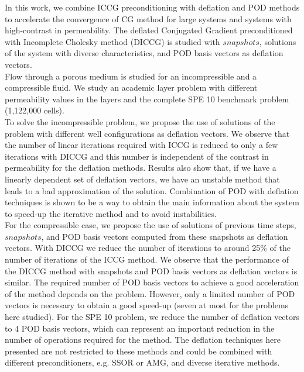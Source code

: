 \documentclass[review]{elsarticle}
\begin{document}
In this work, we combine ICCG preconditioning with deflation and POD methods to accelerate the 
convergence of CG method for large systems and systems with high-contrast in permeability. 
The deflated Conjugated Gradient preconditioned with Incomplete Cholesky method (DICCG) is studied 
with $snapshots$, solutions of the system with diverse characteristics, and POD basis vectors as 
deflation vectors. \\
Flow through a porous medium is studied for an incompressible and a compressible fluid. We study an 
academic layer problem with different permeability values in the layers and the complete SPE 10 
benchmark problem (1,122,000 cells).\\
To solve the incompressible problem, we propose the use of solutions of the problem with different 
well configurations as deflation vectors. We observe that the number of linear iterations required with ICCG is reduced to only a few iterations with DICCG and this number is independent of the contrast in permeability for the deflation methods. Results also show that, if we have a linearly dependent set of deflation vectors, we have an unstable method that leads to a bad approximation of the solution. Combination of POD with deflation techniques is shown to be a way to obtain the main information about the system to speed-up the iterative method and to avoid instabilities.\\
For the compressible case, we propose the use of solutions of previous time steps, $snapshots$, 
and POD basis vectors computed from these snapshots as deflation vectors. 
With DICCG we reduce the number of iterations to around 25\% of 
the number of iterations of the ICCG method. We observe that the performance of the 
DICCG method with snapshots and POD basis vectors as deflation vectors is similar. The required 
number of POD basis vectors to achieve a good acceleration of the method depends on the problem. 
However, only a limited number of POD vectors is necessary to obtain a good speed-up 
(seven at most for the problems here studied). For the SPE 10 problem, we reduce the number of 
deflation vectors to 4 POD basis vectors, which can represent an important reduction in the number 
of operations required for the method. 
The deflation techniques here presented are not restricted to these methods and could be 
combined with different preconditioners, e.g. SSOR or AMG, and diverse iterative methods.



\end{document}
